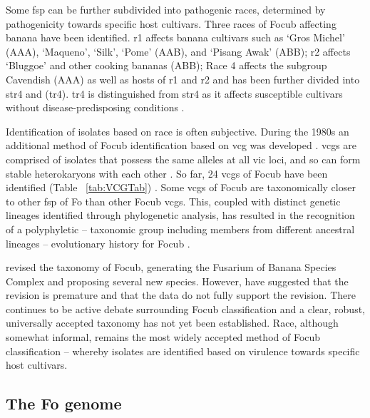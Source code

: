 Some \ac{fsp} can be further subdivided into pathogenic races, determined by pathogenicity towards specific host cultivars. Three races of \ac{Focub} affecting banana have been identified. \acf{r1}  affects banana cultivars such as ‘Gros Michel’ (AAA), ‘Maqueno’, ‘Silk’, ‘Pome’ (AAB), and ‘Pisang Awak’ (ABB); \acf{r2} affects ‘Bluggoe’ and other cooking bananas (ABB); Race 4 affects the subgroup Cavendish (AAA) as well as hosts of \ac{r1} and \ac{r2} \parencite{Ploetz2015a} and has been further divided into \ac{str4} and (\ac{tr4}). \Ac{tr4} is distinguished from \ac{str4} as it affects susceptible cultivars without disease-predisposing conditions \parencite{Ploetz2015b}.  

Identification of isolates based on race is often subjective. During the 1980s an additional method of \ac{Focub} identification based on \ac{vcg} was developed \parencite{Correll1991}. \acp{vcg} are comprised of isolates that possess the same alleles at all \ac{vic} loci, and so can form stable heterokaryons with each other \parencite{Correll1991}. So far, 24 \acp{vcg} of \ac{Focub} have been identified (Table ~\ref{tab:VCGTab}) \parencite{Czislowski2018}. Some \acp{vcg} of \ac{Focub} are taxonomically closer to other \ac{fsp} of \ac{Fo} than other \ac{Focub} \acp{vcg}. This, coupled with distinct genetic lineages identified through phylogenetic analysis, has resulted in the recognition of a polyphyletic – taxonomic group including members from different ancestral lineages – evolutionary history for \ac{Focub} \parencite{Koenig1997, Ploetz2007}. 

\textcite{Maryani2019} revised the taxonomy of \ac{Focub}, generating the Fusarium of Banana Species Complex and proposing several new species. However, \parencite{Torres2021} have suggested that the revision is premature and that the data do not fully support the revision. There continues to be active debate surrounding \ac{Focub} classification and a clear, robust, universally accepted taxonomy has not yet been established. Race, although somewhat informal, remains the most widely accepted method of \ac{Focub} classification – whereby isolates are identified based on virulence towards specific host cultivars.  

\afterpage{



\clearpage
}

\subsection{The \acl{Fo} genome} 


